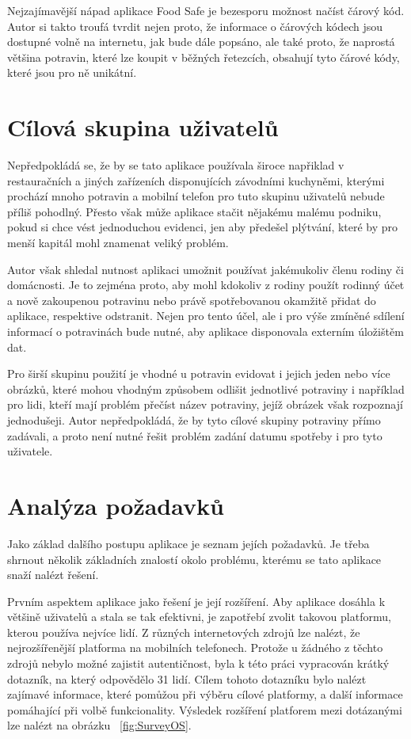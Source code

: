 \documentclass[thesis=B,czech]{FITthesis}[2013/10/20]
\begin{document}
Nejzajímavější nápad aplikace Food Safe je bezesporu možnost načíst čárový kód. Autor si takto troufá tvrdit nejen proto, že informace o čárových kódech jsou dostupné volně na internetu, jak bude dále popsáno, ale také proto, že naprostá většina potravin, které lze koupit v běžných řetezcích, obsahují tyto čárové kódy, které jsou pro ně unikátní.

\section{Cílová skupina uživatelů}

Nepředpokládá se, že by se tato aplikace používala široce napřiklad v restauračních a jiných zařízeních disponujících závodními kuchyněmi, kterými prochází mnoho potravin a mobilní telefon pro tuto skupinu uživatelů nebude příliš pohodlný. Přesto však může aplikace stačit nějakému malému podniku, pokud si chce vést jednoduchou evidenci, jen aby předešel plýtvání, které by pro menší kapitál mohl znamenat veliký problém.

Autor však shledal nutnost aplikaci umožnit používat jakémukoliv členu rodiny či domácnosti. Je to zejména proto, aby mohl kdokoliv z rodiny použít rodinný účet a nově zakoupenou potravinu nebo právě spotřebovanou okamžitě přidat do aplikace, respektive odstranit. Nejen pro tento účel, ale i pro výše zmíněné sdílení informací o potravinách bude nutné, aby aplikace disponovala externím úložištěm dat.

Pro širší skupinu použití je vhodné u potravin evidovat i jejich jeden nebo více obrázků, které mohou vhodným způsobem odlišit jednotlivé potraviny i například pro lidi, kteří mají problém přečíst název potraviny, jejíž obrázek však rozpoznají jednodušeji. Autor nepředpokládá, že by tyto cílové skupiny potraviny přímo zadávali, a proto není nutné řešit problém zadání datumu spotřeby i pro tyto uživatele.

\clearpage

\section{Analýza požadavků}

Jako základ dalšího postupu aplikace je seznam jejích požadavků. Je třeba shrnout několik základních znalostí okolo problému, kterému se tato aplikace snaží nalézt řešení.

Prvním aspektem aplikace jako řešení je její rozšíření. Aby aplikace dosáhla k většině uživatelů a stala se tak efektivni, je zapotřebí zvolit takovou platformu, kterou používa nejvíce lidí. Z různých internetových zdrojů lze nalézt, že nejrozšířenější platforma na mobilních telefonech. Protože u žádného z těchto zdrojů nebylo možné zajistit autentičnost, byla k této práci vypracován krátký dotazník, na který odpovědělo 31 lidí. Cílem tohoto dotazníku bylo nalézt zajímavé informace, které pomůžou při výběru cílové platformy, a další informace pomáhající při volbě funkcionality. Výsledek rozšíření platforem mezi dotázanými lze nalézt na obrázku ~\ref{fig:SurveyOS}.
\end{document}
